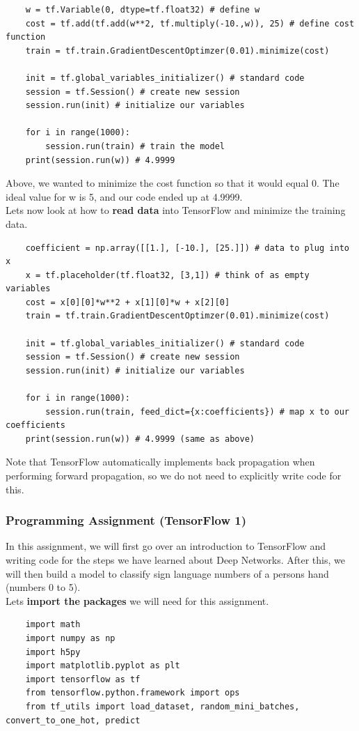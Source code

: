 \documentclass[11pt, a4paper]{article}
\begin{document}
\begin{spacing}{1.1}
\begin{lstlisting}
	w = tf.Variable(0, dtype=tf.float32) # define w
	cost = tf.add(tf.add(w**2, tf.multiply(-10.,w)), 25) # define cost function
	train = tf.train.GradientDescentOptimzer(0.01).minimize(cost)
	
	init = tf.global_variables_initializer() # standard code
	session = tf.Session() # create new session
	session.run(init) # initialize our variables
	
	for i in range(1000):
		session.run(train) # train the model
	print(session.run(w)) # 4.9999	\end{lstlisting} \vspace*{1mm}
	Above, we wanted to minimize the cost function so that it would equal 0. The ideal value for w is 5, and our code ended up at 4.9999. \vspace*{1mm} \\
	Lets now look at how to \textbf{read data} into TensorFlow and minimize the training data.
	\begin{lstlisting}
	coefficient = np.array([[1.], [-10.], [25.]]) # data to plug into x
	x = tf.placeholder(tf.float32, [3,1]) # think of as empty variables
	cost = x[0][0]*w**2 + x[1][0]*w + x[2][0]
	train = tf.train.GradientDescentOptimzer(0.01).minimize(cost)
	
	init = tf.global_variables_initializer() # standard code
	session = tf.Session() # create new session
	session.run(init) # initialize our variables
	
	for i in range(1000):
		session.run(train, feed_dict={x:coefficients}) # map x to our coefficients
	print(session.run(w)) # 4.9999 (same as above)	\end{lstlisting} \vspace*{1mm}
	Note that TensorFlow automatically implements back propagation when performing forward propagation, so we do not need to explicitly write code for this. \newpage

	\subsubsection{Programming Assignment (TensorFlow 1)}
	In this assignment, we will first go over an introduction to TensorFlow and writing code for the steps we have learned about Deep Networks. After this, we will then build a model to classify sign language numbers of a persons hand (numbers 0 to 5). \vspace*{2mm} \\
	Lets \textbf{import the packages} we will need for this assignment. 
	\begin{lstlisting}
	import math
	import numpy as np
	import h5py
	import matplotlib.pyplot as plt
	import tensorflow as tf
	from tensorflow.python.framework import ops
	from tf_utils import load_dataset, random_mini_batches, convert_to_one_hot, predict
	

\end{lstlisting}
\end{spacing}
\end{document}
